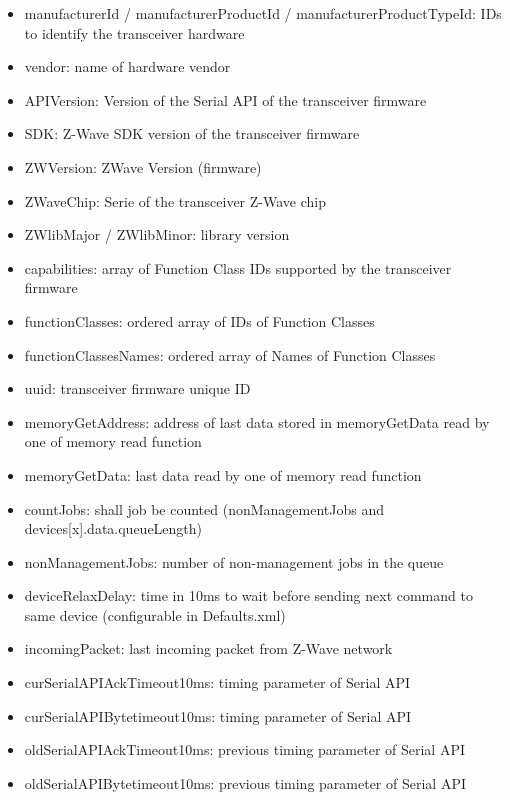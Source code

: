 \begin {itemize}
\begin {itemize}
\begin {itemize}
\item  manufacturerId / manufacturerProductId / manufacturerProductTypeId: IDs to identify the transceiver hardware
\item  vendor: name of hardware vendor
\item  APIVersion: Version of the Serial API of the transceiver firmware
\item  SDK: Z-Wave SDK version of the transceiver firmware
\item  ZWVersion: ZWave Version (firmware)
\item  ZWaveChip: Serie of the transceiver Z-Wave chip
\item  ZWlibMajor / ZWlibMinor: library version 
\item  capabilities: array of Function Class IDs supported by the transceiver firmware
\item  functionClasses: ordered array of IDs of Function Classes
\item  functionClassesNames: ordered array of Names of Function Classes
\item  uuid: \zway transceiver firmware unique ID

\item  memoryGetAddress: address of last data stored in memoryGetData read by one of memory read function
\item  memoryGetData: last data read by one of memory read function
\item  countJobs: shall job be counted (nonManagementJobs and devices[x].data.queueLength)
\item  nonManagementJobs: number of non-management jobs in the queue
\item  deviceRelaxDelay: time in 10ms to wait before sending next command to same device (configurable in Defaults.xml)
\item  incomingPacket: last incoming packet from Z-Wave network

\item  curSerialAPIAckTimeout10ms: timing parameter of Serial API
\item  curSerialAPIBytetimeout10ms: timing parameter of Serial API
\item  oldSerialAPIAckTimeout10ms: previous timing parameter of Serial API
\item  oldSerialAPIBytetimeout10ms: previous timing parameter of Serial API
\end {itemize}

\end {itemize}
\end {itemize}

